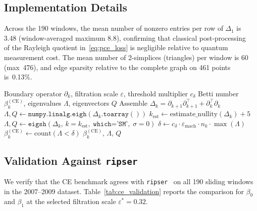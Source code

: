 \documentclass[conference,10pt]{IEEEtran}
\begin{document}
\subsection{Implementation Details}

Across the 190 windows, the mean number of nonzero entries per row of
$\Delta_1$ is 3.48 (window-averaged maximum 8.8), confirming that
classical post-processing of the Rayleigh quotient
in~\eqref{eq:pce_loss} is negligible relative to quantum measurement
cost. The mean number of 2-simplices (triangles) per window is 60
(max~476), and edge sparsity relative to the complete graph on 461
points is~0.13\%.

\begin{algorithm}[t]
\caption{Classical Exact-Eigensolver (CE) Benchmark}
\label{alg:ce}
\begin{algorithmic}[1]
\REQUIRE Boundary operator $\partial_k$, filtration scale $\varepsilon$,
         threshold multiplier $c_\delta$
\ENSURE Betti number $\beta_k^{(\mathrm{CE})}$, eigenvalues $\Lambda$,
        eigenvectors $Q$
\STATE Assemble $\Delta_k = \partial_{k+1}\partial_{k+1}^\top
       + \partial_k^\top\partial_k$
  \STATE $\Lambda,Q \leftarrow
         \texttt{numpy.linalg.eigh}(\Delta_k.\texttt{toarray}())$
\ELSE
  \STATE $k_{\mathrm{est}} \leftarrow
         \mathrm{estimate\_nullity}(\Delta_k)+5$
  \STATE $\Lambda,Q \leftarrow
         \texttt{eigsh}(\Delta_k,\,k=k_{\mathrm{est}},
         \;\texttt{which='SM'},\;\sigma=0)$
\ENDIF
\STATE $\delta \leftarrow c_\delta\cdot\varepsilon_{\mathrm{mach}}
       \cdot n_k\cdot\max(\Lambda)$
\STATE $\beta_k^{(\mathrm{CE})} \leftarrow
       \mathrm{count}(\Lambda<\delta)$
\RETURN $\beta_k^{(\mathrm{CE})},\,\Lambda,\,Q$
\end{algorithmic}
\end{algorithm}

\subsection{Validation Against \texttt{ripser}}

We verify that the CE benchmark agrees with
\texttt{ripser}~\cite{bauer2021ripser} on all 190 sliding windows in
the 2007--2009 dataset. Table~\ref{tab:ce_validation} reports the
comparison for $\beta_0$ and $\beta_1$ at the selected filtration
scale $\varepsilon^*=0.32$.
\end{document}

